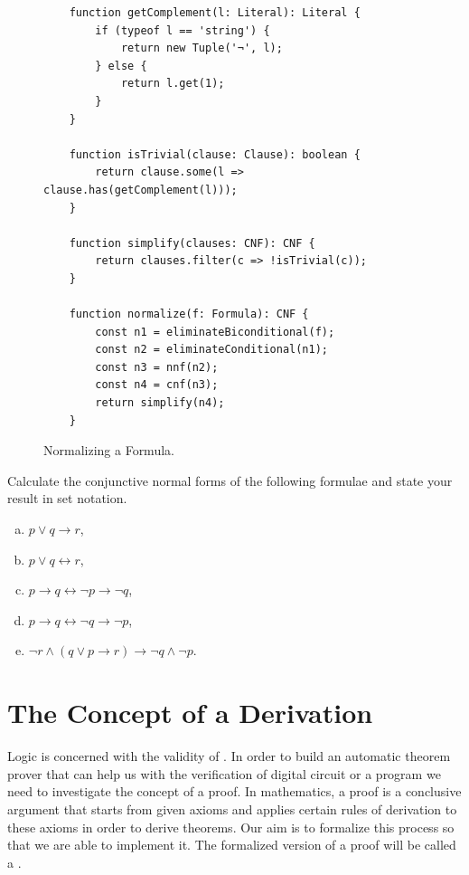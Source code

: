 \begin{figure}[!ht]
  \centering
\begin{verbatim}
    function getComplement(l: Literal): Literal {
        if (typeof l == 'string') {
            return new Tuple('¬', l);
        } else {
            return l.get(1);
        }
    }
    
    function isTrivial(clause: Clause): boolean {
        return clause.some(l => clause.has(getComplement(l)));
    }
      
    function simplify(clauses: CNF): CNF {
        return clauses.filter(c => !isTrivial(c));
    }                
  
    function normalize(f: Formula): CNF {
        const n1 = eliminateBiconditional(f);
        const n2 = eliminateConditional(n1);
        const n3 = nnf(n2);
        const n4 = cnf(n3);
        return simplify(n4);
    }
\end{verbatim} 
\vspace*{-0.3cm}
  \caption{Normalizing a Formula.}
  \label{fig:normalize}
\end{figure}
\pagebreak

\exerciseEng
Calculate the conjunctive normal forms of the following formulae and state your result in set notation.
\begin{enumerate}[(a)]
\item $p \vee q \rightarrow r$,
\item $p \vee q \leftrightarrow r$,
\item $p \rightarrow q \leftrightarrow \neg p \rightarrow \neg q$,
\item $p \rightarrow q \leftrightarrow \neg q \rightarrow \neg p$,
\item $\neg r \wedge (q \vee p \rightarrow r) \rightarrow \neg q \wedge \neg p$.
\end{enumerate}

\section{The Concept of a Derivation}
Logic is concerned with the validity of . In order to build an automatic theorem prover that can 
help us with the verification of digital circuit or a program we need to investigate the concept of a proof.
In mathematics, a proof is a conclusive argument that starts from given axioms and applies certain rules of
derivation to these axioms in order to derive theorems.  Our aim is to formalize this process so that we are
able to implement it. The formalized version of a proof will be called a .

